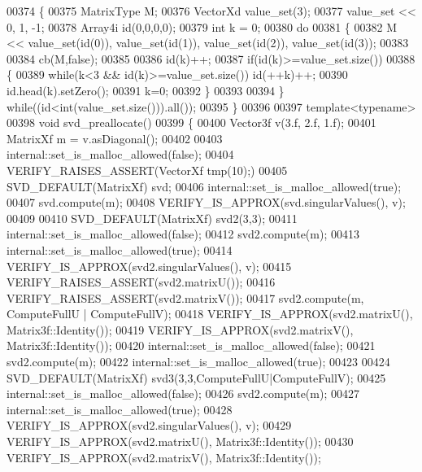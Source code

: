 \begin{DoxyCode}
00374 \{
00375   MatrixType M;
00376   VectorXd value\_set(3);
00377   value\_set << 0, 1, -1;
00378   Array4i id(0,0,0,0);
00379   \textcolor{keywordtype}{int} k = 0;
00380   \textcolor{keywordflow}{do}
00381   \{
00382     M << value\_set(\textcolor{keywordtype}{id}(0)), value\_set(\textcolor{keywordtype}{id}(1)), value\_set(\textcolor{keywordtype}{id}(2)), value\_set(\textcolor{keywordtype}{id}(3));
00383     
00384     cb(M,\textcolor{keyword}{false});
00385     
00386     id(k)++;
00387     \textcolor{keywordflow}{if}(\textcolor{keywordtype}{id}(k)>=value\_set.size())
00388     \{
00389       \textcolor{keywordflow}{while}(k<3 && \textcolor{keywordtype}{id}(k)>=value\_set.size()) \textcolor{keywordtype}{id}(++k)++;
00390       \textcolor{keywordtype}{id}.head(k).setZero();
00391       k=0;
00392     \}
00393     
00394   \} \textcolor{keywordflow}{while}((\textcolor{keywordtype}{id}<\textcolor{keywordtype}{int}(value\_set.size())).all());
00395 \}
00396 
00397 \textcolor{keyword}{template}<\textcolor{keyword}{typename}>
00398 \textcolor{keywordtype}{void} svd\_preallocate()
00399 \{
00400   Vector3f v(3.f, 2.f, 1.f);
00401   MatrixXf m = v.asDiagonal();
00402 
00403   internal::set\_is\_malloc\_allowed(\textcolor{keyword}{false});
00404   VERIFY\_RAISES\_ASSERT(VectorXf tmp(10);)
00405   SVD\_DEFAULT(MatrixXf) svd;
00406   internal::set\_is\_malloc\_allowed(\textcolor{keyword}{true});
00407   svd.compute(m);
00408   VERIFY\_IS\_APPROX(svd.singularValues(), v);
00409 
00410   SVD\_DEFAULT(MatrixXf) svd2(3,3);
00411   internal::set\_is\_malloc\_allowed(\textcolor{keyword}{false});
00412   svd2.compute(m);
00413   internal::set\_is\_malloc\_allowed(\textcolor{keyword}{true});
00414   VERIFY\_IS\_APPROX(svd2.singularValues(), v);
00415   VERIFY\_RAISES\_ASSERT(svd2.matrixU());
00416   VERIFY\_RAISES\_ASSERT(svd2.matrixV());
00417   svd2.compute(m, ComputeFullU | ComputeFullV);
00418   VERIFY\_IS\_APPROX(svd2.matrixU(), Matrix3f::Identity());
00419   VERIFY\_IS\_APPROX(svd2.matrixV(), Matrix3f::Identity());
00420   internal::set\_is\_malloc\_allowed(\textcolor{keyword}{false});
00421   svd2.compute(m);
00422   internal::set\_is\_malloc\_allowed(\textcolor{keyword}{true});
00423 
00424   SVD\_DEFAULT(MatrixXf) svd3(3,3,ComputeFullU|ComputeFullV);
00425   internal::set\_is\_malloc\_allowed(\textcolor{keyword}{false});
00426   svd2.compute(m);
00427   internal::set\_is\_malloc\_allowed(\textcolor{keyword}{true});
00428   VERIFY\_IS\_APPROX(svd2.singularValues(), v);
00429   VERIFY\_IS\_APPROX(svd2.matrixU(), Matrix3f::Identity());
00430   VERIFY\_IS\_APPROX(svd2.matrixV(), Matrix3f::Identity());

\end{DoxyCode}
